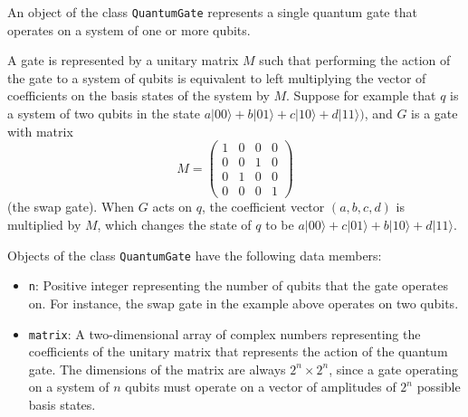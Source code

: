 \documentclass{article}
\begin{document}
An object of the class \verb~QuantumGate~ represents a single quantum gate that operates on a system of one or more qubits. 

A gate is represented by a unitary matrix $M$ such that performing the action of the gate to a system of qubits is equivalent to left multiplying the vector of coefficients on the basis states of the system by $M$. Suppose for example that $q$ is a system of two qubits in the state $a|00\rangle + b|01\rangle + c|10\rangle + d|11\rangle)$, and $G$ is a gate with matrix
\[M = \left(\begin{array}{cccc} 
1 & 0 & 0 & 0 \\
0 & 0 & 1 & 0 \\ 
0 & 1 & 0 & 0 \\
0 & 0 & 0 & 1 
\end{array}\right) \] 
(the swap gate). When $G$ acts on $q$, the coefficient vector $(a, b, c, d)$ is multiplied by $M$, which changes the state of $q$ to be $a|00\rangle + c|01\rangle + b|10\rangle + d|11\rangle$. 

Objects of the class \verb~QuantumGate~ have the following data members: 
\begin{itemize} 
\item \verb~n~: Positive integer representing the number of qubits that the gate operates on. For instance, the swap gate in the example above operates on two qubits. 

\item \verb~matrix~: A two-dimensional array of complex numbers representing the coefficients of the unitary matrix that represents the action of the quantum gate. The dimensions of the matrix are always $2^n \times 2^n$, since a gate operating on a system of $n$ qubits must operate on a vector of amplitudes of $2^n$ possible basis states. 

\end{itemize} 
\end{document}
